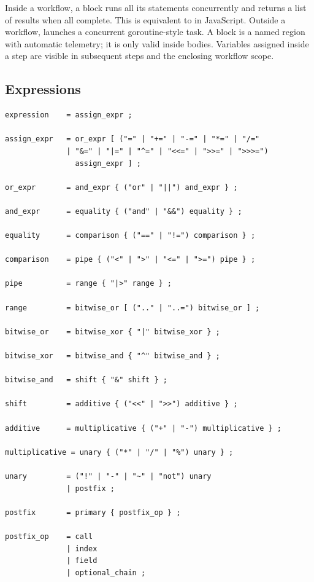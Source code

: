 \begin{note}
Inside a workflow, a  block runs all its statements concurrently and returns a list of results when all complete. This is equivalent to  in JavaScript. Outside a workflow,  launches a concurrent goroutine-style task. A  block is a named region with automatic telemetry; it is only valid inside  bodies. Variables assigned inside a step are visible in subsequent steps and the enclosing workflow scope.
\end{note}

\subsection{Expressions}

\begin{lstlisting}[language=EBNF]
expression    = assign_expr ;

assign_expr   = or_expr [ ("=" | "+=" | "-=" | "*=" | "/="
              | "&=" | "|=" | "^=" | "<<=" | ">>=" | ">>>=")
                assign_expr ] ;

or_expr       = and_expr { ("or" | "||") and_expr } ;

and_expr      = equality { ("and" | "&&") equality } ;

equality      = comparison { ("==" | "!=") comparison } ;

comparison    = pipe { ("<" | ">" | "<=" | ">=") pipe } ;

pipe          = range { "|>" range } ;

range         = bitwise_or [ (".." | "..=") bitwise_or ] ;

bitwise_or    = bitwise_xor { "|" bitwise_xor } ;

bitwise_xor   = bitwise_and { "^" bitwise_and } ;

bitwise_and   = shift { "&" shift } ;

shift         = additive { ("<<" | ">>") additive } ;

additive      = multiplicative { ("+" | "-") multiplicative } ;

multiplicative = unary { ("*" | "/" | "%") unary } ;

unary         = ("!" | "-" | "~" | "not") unary
              | postfix ;

postfix       = primary { postfix_op } ;

postfix_op    = call
              | index
              | field
              | optional_chain ;


\end{lstlisting}
